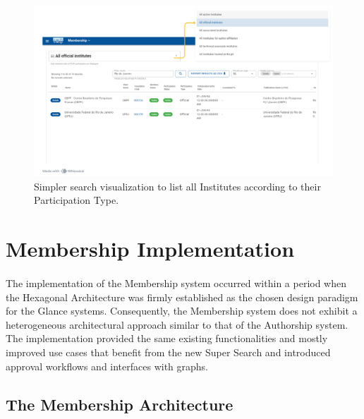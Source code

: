 \begin{figure} [H]
    \centering
    \includegraphics[width=1\linewidth]{figuras/simple_search.png}
    \caption{Simpler search visualization to list all Institutes according to their Participation Type.}
    \label{fig:simple_search}
\end{figure}

\section{Membership Implementation} 

\paragraph{} The implementation of the Membership system occurred within a period when the Hexagonal Architecture was firmly established as the chosen design paradigm for the Glance systems. Consequently, the Membership system does not exhibit a heterogeneous architectural approach similar to that of the Authorship system. The implementation provided the same existing functionalities and mostly improved use cases that benefit from the new Super Search and introduced approval workflows and interfaces with graphs.

\subsection{The Membership Architecture}

